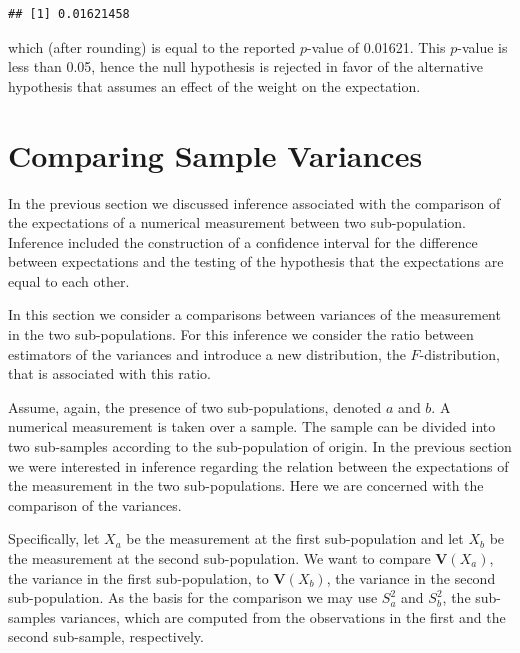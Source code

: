 \documentclass[
]{krantz}
\newcommand{\Var}{\mathbf{V}}
\theoremstyle{definition}
\theoremstyle{definition}
\theoremstyle{definition}
\theoremstyle{remark}
\begin{document}
\begin{verbatim}
## [1] 0.01621458
\end{verbatim}

which (after rounding) is equal to the reported \(p\)-value of 0.01621.
This \(p\)-value is less than 0.05, hence the null hypothesis is rejected
in favor of the alternative hypothesis that assumes an effect of the
weight on the expectation.

\hypertarget{comparing-sample-variances}{%
\section{Comparing Sample Variances}\label{comparing-sample-variances}}

In the previous section we discussed inference associated with the
comparison of the expectations of a numerical measurement between two
sub-population. Inference included the construction of a confidence
interval for the difference between expectations and the testing of the
hypothesis that the expectations are equal to each other.

In this section we consider a comparisons between variances of the
measurement in the two sub-populations. For this inference we consider
the ratio between estimators of the variances and introduce a new
distribution, the \(F\)-distribution, that is associated with this ratio.

Assume, again, the presence of two sub-populations, denoted \(a\) and \(b\).
A numerical measurement is taken over a sample. The sample can be
divided into two sub-samples according to the sub-population of origin.
In the previous section we were interested in inference regarding the
relation between the expectations of the measurement in the two
sub-populations. Here we are concerned with the comparison of the
variances.

Specifically, let \(X_a\) be the measurement at the first sub-population
and let \(X_b\) be the measurement at the second sub-population. We want
to compare \(\Var(X_a)\), the variance in the first sub-population, to
\(\Var(X_b)\), the variance in the second sub-population. As the basis for
the comparison we may use \(S_a^2\) and \(S_b^2\), the sub-samples
variances, which are computed from the observations in the first and the
second sub-sample, respectively.
\end{document}
